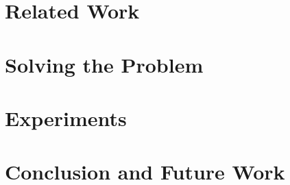 \documentclass{llncs}
\begin{document}
\section{Related Work} 
\label{sec:relat}


\section{Solving the Problem}
\label{sec:alter}


\section{Experiments}
\label{sec:exp}


\section{Conclusion and Future Work}
\label{sec:con}


\printbibliography

\end{document}
